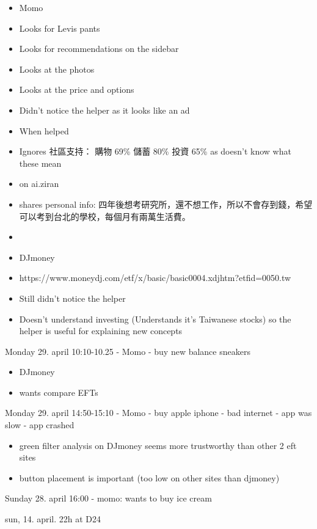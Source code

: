 \documentclass[
  letterpaper,
  DIV=11,
  numbers=noendperiod]{scrartcl}
\providecommand{\tightlist}{%
  \setlength{\itemsep}{0pt}\setlength{\parskip}{0pt}}\usepackage{longtable,booktabs,array}
\begin{document}
\begin{itemize}
\tightlist
\item
  Momo
\item
  Looks for Levis pants
\item
  Looks for recommendations on the sidebar
\item
  Looks at the photos
\item
  Looks at the price and options
\item
  Didn't notice the helper as it looks like an ad
\item
  When helped
\item
  Ignores 社區支持： 購物 69\% 儲蓄 80\% 投資 65\% as doesn't know what
  these mean
\item
  on ai.ziran
\item
  shares personal info:
  四年後想考研究所，還不想工作，所以不會存到錢，希望可以考到台北的學校，每個月有兩萬生活費。
\item
\item
  DJmoney
\item
  https://www.moneydj.com/etf/x/basic/basic0004.xdjhtm?etfid=0050.tw
\item
  Still didn't notice the helper
\item
  Doesn't understand investing (Understands it's Taiwanese stocks) so
  the helper is useful for explaining new concepts
\end{itemize}

Monday 29. april 10:10-10.25 - Momo - buy new balance sneakers

\begin{itemize}
\tightlist
\item
  DJmoney
\item
  wants compare EFTs
\end{itemize}

Monday 29. april 14:50-15:10 - Momo - buy apple iphone - bad internet -
app was slow - app crashed

\begin{itemize}
\tightlist
\item
  green filter analysis on DJmoney seems more trustworthy than other 2
  eft sites
\item
  button placement is important (too low on other sites than djmoney)
\end{itemize}

Sunday 28. april 16:00 - momo: wants to buy ice cream

sun, 14. april. 22h at D24
\end{document}
